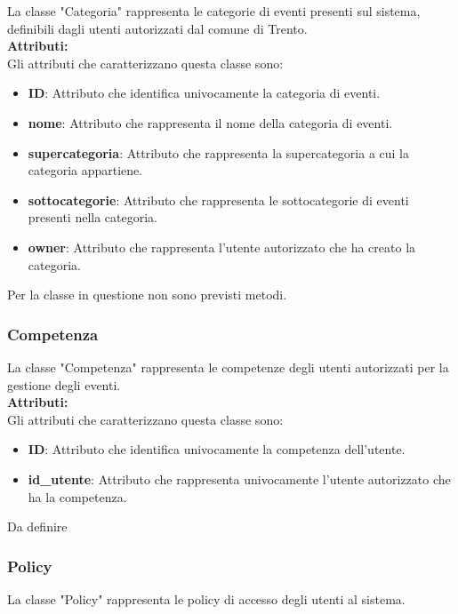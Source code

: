 \documentclass{article}
\begin{document}
La classe "Categoria" rappresenta le categorie di eventi presenti sul sistema, definibili dagli utenti autorizzati dal comune di Trento.\\

\textbf{Attributi:}\\
Gli attributi che caratterizzano questa classe sono:
\begin{itemize}
    \item \textbf{ID}: Attributo che identifica univocamente la categoria di eventi.
    \item \textbf{nome}: Attributo che rappresenta il nome della categoria di eventi.
    \item \textbf{supercategoria}: Attributo che rappresenta la supercategoria a cui la categoria appartiene.
    \item \textbf{sottocategorie}: Attributo che rappresenta le sottocategorie di eventi presenti nella categoria.
    \item \textbf{owner}: Attributo che rappresenta l'utente autorizzato che ha creato la categoria.\\
\end{itemize}
Per la classe in questione non sono previsti metodi.

\subsubsection{Competenza}

La classe "Competenza" rappresenta le competenze degli utenti autorizzati per la gestione degli eventi.\\

\textbf{Attributi:}\\
Gli attributi che caratterizzano questa classe sono:
\begin{itemize}
    \item \textbf{ID}: Attributo che identifica univocamente la competenza dell'utente.
    \item \textbf{id\_utente}: Attributo che rappresenta univocamente l'utente autorizzato che ha la competenza.
\end{itemize}

Da definire

\subsubsection{Policy}

La classe "Policy" rappresenta le policy di accesso degli utenti al sistema.\\
\end{document}
